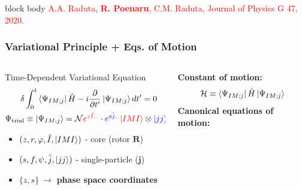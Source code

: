 \documentclass{beamer}
\begin{document}
\begin{frame}
\begin{figure}
	\end{figure}
	\vspace{-0.5cm}
	\begin{beamercolorbox}[rounded=true,shadow=false, wd=\linewidth,]{block body}
		\centering
		\textcolor{red}{\footnotesize{A.A. Raduta, \textbf{R. Poenaru}, C.M. Raduta, Journal of Physics G 47, 2020.}}
	\end{beamercolorbox}
\end{frame}

\begin{frame}
	\frametitle{Variational Principle + Eqs. of Motion}
	\begin{columns}
		\begin{column}{0.6\textwidth}
			\begin{exampleblock}{Time-Dependent Variational Equation}
				\begin{align}
					\delta&\int_0^t\bra{\Psi_{IM;j}}\hat{H}-i\frac{\partial}{\partial t'}\ket{\Psi_{IM;j}}dt'=0\nonumber\\
					\Psi_\text{trial}&\equiv\ket{\Psi_{IM;j}}=\mathcal{N}{\color{red}e^{z\hat{I}_-}}\cdot{\color{blue}e^{s\hat{j}_-}}{\color{red}\ket{IMI}}\otimes{\color{blue}\ket{jj}}\nonumber
				\end{align}
				\vspace{-0.4cm}
				\begin{itemize}
					\item {\color{red}$(z,r,\varphi,\hat{I},\ket{IMI})$} - core (rotor {\color{red}$\mathbf{R}$})
					\item {\color{blue}$(s,f,\psi,\hat{j},\ket{jj})$} - single-particle ({\color{blue}$\mathbf{j}$})
					\item $\{z,s\}\ \rightarrow$ \textbf{phase space coordinates}
				\end{itemize}
			\end{exampleblock}
		\end{column}
		\begin{column}{0.4\textwidth}
			\textbf{Constant of motion:}
			\begin{align}
				\mathcal{H}\equiv\bra{\Psi_{IM;j}}\hat{H}\ket{\Psi_{IM;j}}\nonumber
			\end{align}
			\textbf{Canonical equations of motion:}

\end{column}
\end{columns}
\end{frame}
\end{document}
